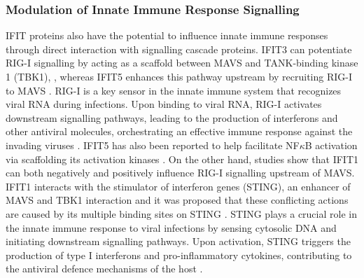 \subsubsection{Modulation of Innate Immune Response Signalling} \label{Modulation of Innate Immune Response Signalling}
IFIT proteins also have the potential to influence innate immune responses through direct interaction with signalling cascade proteins. IFIT3 can potentiate RIG-I signalling by acting as a scaffold between MAVS and TANK-binding kinase 1 (TBK1), \cite{Liu2011IFN-InducedTBK1}, whereas IFIT5 enhances this pathway upstream by recruiting RIG-I to MAVS \cite{Zhang2013IFIT5Pathways}. RIG-I is a key sensor in the innate immune system that recognizes viral RNA during infections. Upon binding to viral RNA, RIG-I activates downstream signalling pathways, leading to the production of interferons and other antiviral molecules, orchestrating an effective immune response against the invading viruses \cite{Thoresen2021TheSignaling}. IFIT5 has also been reported to help facilitate NF\(\kappa\)B activation via scaffolding its activation kinases \cite{Zhang2013IFIT5Pathways}. On the other hand, studies show that IFIT1 can both negatively and positively influence RIG-I signalling upstream of MAVS. IFIT1 interacts with the stimulator of interferon genes (STING), an enhancer of MAVS and TBK1 interaction and it was proposed that these conflicting actions are caused by its multiple binding sites on STING \cite{Li2009ISG56Response, Reynaud2015IFIT1Interferon}. STING plays a crucial role in the innate immune response to viral infections by sensing cytosolic DNA and initiating downstream signalling pathways. Upon activation, STING triggers the production of type I interferons and pro-inflammatory cytokines, contributing to the antiviral defence mechanisms of the host \cite{Barber2015STING:Cancer}.

